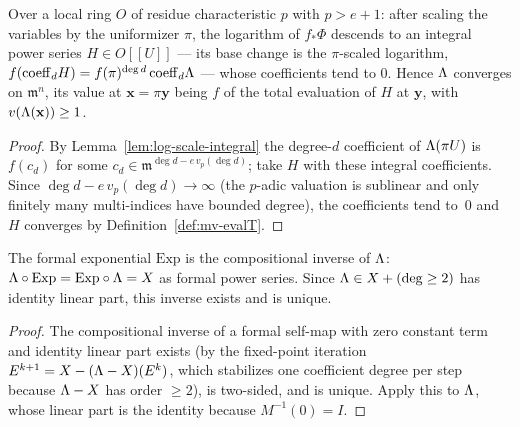 \begin{lemma}
\label{lem:log-converge}
\leanok
{}
Over a local ring $O$ of residue characteristic $p$ with $p > e + 1$: after scaling the
variables by the uniformizer $\pi$, the logarithm of $f_*\Phi$ descends to an integral
power series $H \in O[[U]]$ --- its base change is the $\pi$-scaled logarithm,
$f(\mathrm{coeff}_d H) = f(\pi)^{\deg d}\,\mathrm{coeff}_d \Lambda$ --- whose coefficients
tend to $0$. Hence $\Lambda$ converges on $\mathfrak m^n$, its value at
$\mathbf x = \pi\mathbf y$ being $f$ of the total evaluation of $H$ at $\mathbf y$, with
$v(\Lambda(\mathbf x)) \ge 1$.
\end{lemma}
\begin{proof}
\leanok
By Lemma~\ref{lem:log-scale-integral} the degree-$d$ coefficient of $\Lambda(\pi U)$ is
$f(c_d)$ for some $c_d \in \mathfrak m^{\deg d - e\,v_p(\deg d)}$; take $H$ with these
integral coefficients. Since $\deg d - e\,v_p(\deg d) \to \infty$ (the $p$-adic valuation
is sublinear and only finitely many multi-indices have bounded degree), the coefficients
tend to~$0$ and $H$ converges by Definition~\ref{def:mv-evalT}.
\end{proof}

\begin{lemma}
\label{lem:fgl-exp}
\leanok
{}
The formal exponential $\mathrm{Exp}$ is the compositional inverse of $\Lambda$:
$\Lambda \circ \mathrm{Exp} = \mathrm{Exp} \circ \Lambda = X$ as formal power series. Since
$\Lambda \in X + (\deg \ge 2)$ has identity linear part, this inverse exists and is unique.
\end{lemma}
\begin{proof}
\leanok
The compositional inverse of a formal self-map with zero constant term and identity
linear part exists (by the fixed-point iteration $E^{k+1} = X - (\Lambda - X)(E^k)$, which
stabilizes one coefficient degree per step because $\Lambda - X$ has order $\ge 2$), is
two-sided, and is unique. Apply this to $\Lambda$, whose linear part is the identity
because $M^{-1}(0) = I$.
\end{proof}

